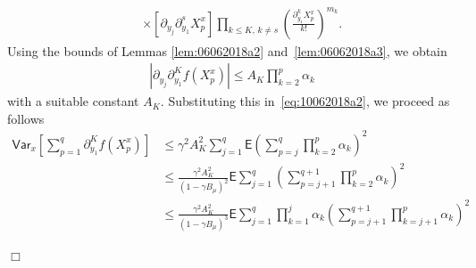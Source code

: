 \documentclass[bj]{imsart}
\newcommand{\proofendsign}{$\Box$}
\newenvironment{proof}{{\noindent \bf Proof }}
 {{\hspace*{\fill}\proofendsign\par\bigskip}}
\begin{document}
\begin{proof}
\begin{eqnarray*}
\\
&& \times\left[\partial_{y_{j}}\partial_{y_{1}}^{s}X^x_{p}\right]
\prod_{k\le K,\,k\neq s}\left(\frac{\partial_{y_{1}}^{k}X^x_{p}}{k!}\right)^{m_{k}}.
\end{eqnarray*}
Using the bounds of
Lemmas \ref{lem:06062018a2} and~\ref{lem:06062018a3},
we obtain
\begin{eqnarray}
\label{eq:part-part}
\left|\partial_{y_{j}}\partial_{y_{1}}^{K}f\left(X_{p}^x\right)\right|
\leq A_{K}\prod_{k=2}^{p}\alpha_{k}
\end{eqnarray}
with a suitable constant $A_{K}$.
Substituting this in~\eqref{eq:10062018a2},
we proceed as follows
\begin{align*}
\mathsf{Var}_x\left[\sum_{p=1}^{q}\partial_{y_{1}}^{K}f\left(X_{p}^x\right)\right]
&\le
\gamma^2 A_{K}^{2}\sum_{j=1}^{q}
\mathsf{E}\left(\sum_{p=j}^{q}\prod_{k=2}^{p}\alpha_{k}\right)^{2}
\\
&\le
\frac{\gamma^2 A_{K}^{2}}{(1-\gamma B_\mu)^2}
\mathsf{E}\sum_{j=1}^{q}
\left(\sum_{p=j+1}^{q+1}  \prod_{k=2}^{p} \alpha_{k}
\right)^{2}
\\
&\le
\frac{\gamma^2 A_{K}^{2}}{(1-\gamma B_\mu)^3}
\mathsf{E}\sum_{j=1}^{q}
\prod_{k=1}^{j} \alpha_{k}
\left(\sum_{p=j+1}^{q+1}  \prod_{k=j+1}^{p} \alpha_{k}
\right)^{2}
\end{align*}


\end{proof}
\end{document}
